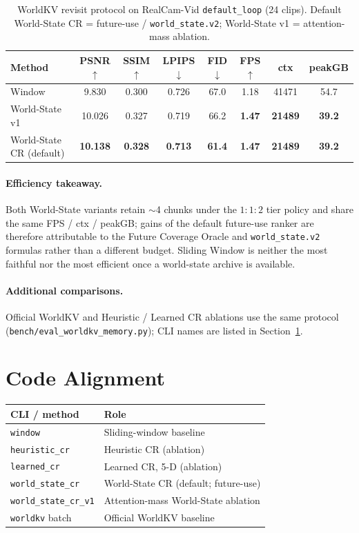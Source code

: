 \documentclass{article}
\newcommand{\method}{World-State CR}
\begin{document}
\begin{table}[t]
  \centering
  \caption{WorldKV revisit protocol on RealCam-Vid \texttt{default\_loop}
  (24 clips).  Default \method{} = future-use / \texttt{world\_state.v2};
  World-State v1 = attention-mass ablation.}
  \label{tab:main-loop}
  \begin{tabular}{lccccccc}
  \toprule
  Method & PSNR$\uparrow$ & SSIM$\uparrow$ & LPIPS$\downarrow$ & FID$\downarrow$
         & FPS$\uparrow$ & ctx & peakGB \\
  \midrule
  Window & 9.830 & 0.300 & 0.726 & 67.0 & 1.18 & 41471 & 54.7 \\
  World-State v1 & 10.026 & 0.327 & 0.719 & 66.2
         & \textbf{1.47} & \textbf{21489} & \textbf{39.2} \\
  \method{} (default) & \textbf{10.138} & \textbf{0.328} & \textbf{0.713}
         & \textbf{61.4} & \textbf{1.47} & \textbf{21489} & \textbf{39.2} \\
  \bottomrule
  \end{tabular}
\end{table}

\paragraph{Efficiency takeaway.}
Both World-State variants retain $\sim$4 chunks under the $1{:}1{:}2$ tier
policy and share the same FPS / ctx / peakGB; gains of the default
future-use ranker are therefore attributable to the Future Coverage Oracle
and \texttt{world\_state.v2} formulas rather than a different budget.
Sliding Window is neither the most faithful nor the most efficient once a
world-state archive is available.

\paragraph{Additional comparisons.}
Official WorldKV and Heuristic / Learned CR ablations use the same
protocol (\texttt{bench/eval\_worldkv\_memory.py}); CLI names are listed
in Section~\ref{sec:code}.

\section{Code Alignment}
\label{sec:code}

\begin{center}
\begin{tabular}{ll}
\toprule
CLI / method & Role \\
\midrule
\texttt{window} & Sliding-window baseline \\
\texttt{heuristic\_cr} & Heuristic CR (ablation) \\
\texttt{learned\_cr} & Learned CR, 5-D (ablation) \\
\texttt{world\_state\_cr} & \method{} (default; future-use) \\
\texttt{world\_state\_cr\_v1} & Attention-mass World-State ablation \\
\texttt{worldkv} batch & Official WorldKV baseline \\
\bottomrule
\end{tabular}
\end{center}
\end{document}
